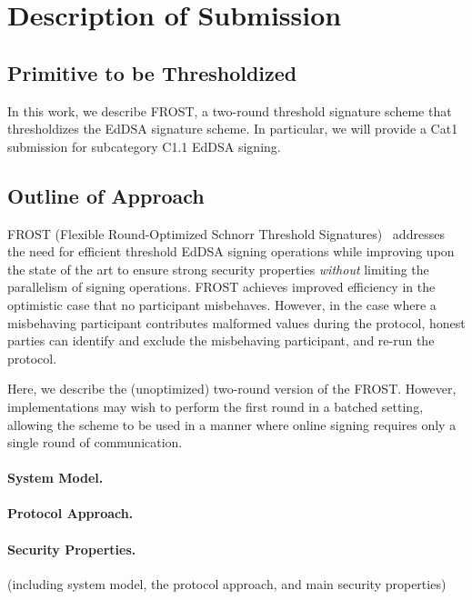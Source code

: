 \section{Description of Submission}

\subsection{Primitive to be Thresholdized}

In this work,
we describe FROST,
a two-round threshold signature scheme that thresholdizes the EdDSA signature scheme.
In particular,
we will provide a Cat1 submission for subcategory C1.1 EdDSA signing.

\subsection{Outline of Approach}

FROST (Flexible Round-Optimized Schnorr Threshold Signatures)~\cite{KomloG20,BellareCKMTZ22} addresses the need for efficient threshold EdDSA signing operations while improving upon the state of the art to ensure strong security properties \emph{without} limiting the parallelism of signing operations.
FROST achieves improved efficiency in the optimistic case that no participant misbehaves.
However, in the case where a misbehaving participant contributes malformed values during the protocol,
honest parties can identify and exclude the misbehaving participant, and re-run the protocol.

Here, we describe the (unoptimized) two-round version of the FROST.
However, implementations may wish to perform the first round in a batched setting,
allowing the scheme to be used in a manner where online signing requires only a single round of communication.

\paragraph{System Model.}

\paragraph{Protocol Approach.}

\paragraph{Security Properties.}
(including system model, the protocol approach, and main security properties)


